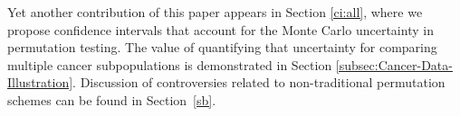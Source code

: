 \documentclass[12pt]{article}
\begin{document}
Yet another contribution of this paper appears in Section \ref{ci:all}, where we propose confidence intervals that account for the Monte Carlo uncertainty in permutation testing. The value of quantifying that uncertainty for comparing multiple cancer subpopulations is demonstrated in Section \ref{subsec:Cancer-Data-Illustration}. Discussion of controversies related to non-traditional permutation schemes can be found in Section~\ref{sb}.




\end{document}
